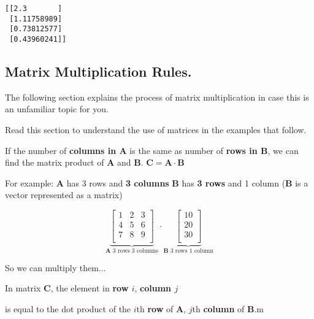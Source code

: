 \documentclass[11pt]{article}
\begin{document}
    \begin{Verbatim}[commandchars=\\\{\}]
[[2.3       ]
 [1.11758989]
 [0.73812577]
 [0.43960241]]

    \end{Verbatim}

    \subsection{Matrix Multiplication
Rules.}\label{matrix-multiplication-rules.}

 The following section explains the process of matrix multiplication in
case this is an unfamiliar topic for you.

Read this section to understand the use of matrices in the examples that
follow.

    If the number of \textbf{columns in A} is the same as number of
\textbf{rows in B}, we can find the matrix product of \(\mathbf{A}\) and
\(\mathbf{B}\). \(\mathbf{C} = \mathbf{A} \cdot \mathbf{B}\)

    For example: \(\mathbf{A}\) has 3 rows and \textbf{3 columns}
\(\mathbf{B}\) has \textbf{3 rows} and 1 column (\(\mathbf{B}\) is a
vector represented as a matrix)

\begin{equation*}
\underbrace{
\begin{bmatrix}
1 & 2 & 3 \\
4 & 5 & 6 \\
7 & 8 & 9 \\
\end{bmatrix}
}_{\mathbf{A} \text{ 3 rows} \text{ 3 columns}}
\cdot
\underbrace{
\begin{bmatrix}
10 \\
20 \\
30 \\
\end{bmatrix}
}_{\mathbf{B} \text{  3 rows} \text{  1 column}}
\end{equation*}

So we can multiply them...

    In matrix \(\mathbf{C}\), the element in \textbf{row \(i\)},
\textbf{column \(j\)}

is equal to the dot product of the \(i\)th \textbf{row} of
\(\mathbf{A}\), \(j\)th \textbf{column} of \(\mathbf{B}\).m
\end{document}
